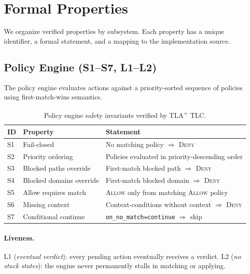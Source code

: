 \documentclass[sigplan,screen,nonacm]{acmart}
\newcommand{\tlaplus}{TLA\textsuperscript{+}\xspace}
\newcommand{\deny}{\textsc{Deny}\xspace}
\newcommand{\allow}{\textsc{Allow}\xspace}
\begin{document}
\section{Formal Properties}
\label{sec:properties}

We organize verified properties by subsystem. Each property has a unique
identifier, a formal statement, and a mapping to the implementation source.

\subsection{Policy Engine (S1--S7, L1--L2)}
\label{sec:policy-engine}

The policy engine evaluates actions against a priority-sorted sequence of
policies using first-match-wins semantics.

\begin{table}[h]
\caption{Policy engine safety invariants verified by \tlaplus TLC.}
\label{tab:policy-safety}
\small
\begin{tabular}{@{}llp{5.2cm}@{}}
\toprule
ID & Property & Statement \\
\midrule
S1 & Fail-closed  & No matching policy $\Rightarrow$ \deny \\
S2 & Priority ordering & Policies evaluated in priority-descending order \\
S3 & Blocked paths override & First-match blocked path $\Rightarrow$ \deny \\
S4 & Blocked domains override & First-match blocked domain $\Rightarrow$ \deny \\
S5 & Allow requires match & \allow only from matching \allow policy \\
S6 & Missing context & Context-conditions without context $\Rightarrow$ \deny \\
S7 & Conditional continue & \texttt{on\_no\_match=continue} $\Rightarrow$ skip \\
\bottomrule
\end{tabular}
\end{table}

\paragraph{Liveness.} L1 (\emph{eventual verdict}): every pending action
eventually receives a verdict. L2 (\emph{no stuck states}): the engine never
permanently stalls in matching or applying.
\end{document}
